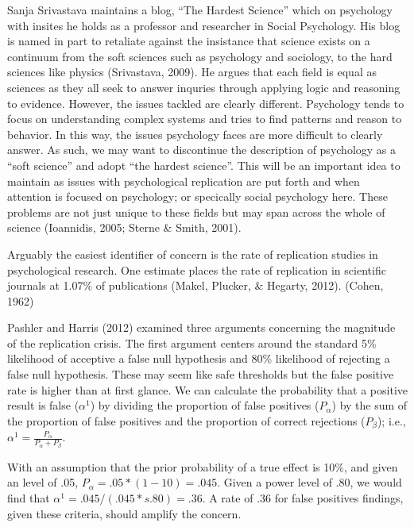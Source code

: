 \documentclass[man]{apa6}
\theoremstyle{definition}
\theoremstyle{definition}
\theoremstyle{definition}
\theoremstyle{remark}
\begin{document}
Sanja Srivastava maintains a blog, \enquote{The Hardest Science} which
on psychology with insites he holds as a professor and researcher in
Social Psychology. His blog is named in part to retaliate against the
insistance that science exists on a continuum from the soft sciences
such as psychology and sociology, to the hard sciences like physics
(Srivastava, 2009). He argues that each field is equal as sciences as
they all seek to answer inquries through applying logic and reasoning to
evidence. However, the issues tackled are clearly different. Psychology
tends to focus on understanding complex systems and tries to find
patterns and reason to behavior. In this way, the issues psychology
faces are more difficult to clearly answer. As such, we may want to
discontinue the description of psychology as a \enquote{soft science}
and adopt \enquote{the hardest science}. This will be an important idea
to maintain as issues with psychological replication are put forth and
when attention is focused on psychology; or specically social psychology
here. These problems are not just unique to these fields but may span
across the whole of science (Ioannidis, 2005; Sterne \& Smith, 2001).

Arguably the easiest identifier of concern is the rate of replication
studies in psychological research. One estimate places the rate of
replication in scientific journals at 1.07\% of publications (Makel,
Plucker, \& Hegarty, 2012). (Cohen, 1962)

Pashler and Harris (2012) examined three arguments concerning the
magnitude of the replication crisis. The first argument centers around
the standard 5\% likelihood of acceptive a false null hypothesis and
80\% likelihood of rejecting a false null hypothesis. These may seem
like safe thresholds but the false positive rate is higher than at first
glance. We can calculate the probability that a positive result is false
(\(\alpha^1\)) by dividing the proportion of false positives
(\(P_\alpha\)) by the sum of the proportion of false positives and the
proportion of correct rejections (\(P_\beta\)); i.e.,
\(\alpha^1 = \frac{P_\alpha}{P_\alpha + P_\beta}\).

With an assumption that the prior probability of a true effect is 10\%,
and given an \alpha level of .05, \(P_\alpha = .05 * (1 - 10) = .045\).
Given a power level of .80, we would find that
\(\alpha^1 = .045 / (.045 *s .80) = .36\). A rate of .36 for false
positives findings, given these criteria, should amplify the concern.
\end{document}
